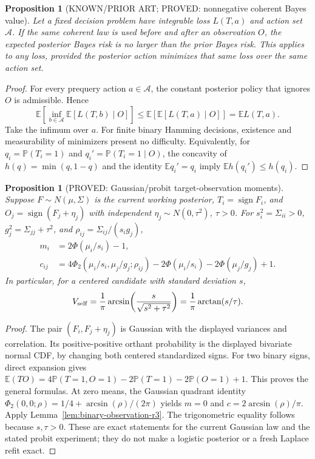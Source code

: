 \documentclass[11pt]{article}
\newtheorem{proposition}[theorem]{Proposition}
\theoremstyle{definition}
\theoremstyle{remark}
\begin{document}
\begin{proposition}[KNOWN/PRIOR ART; PROVED: nonnegative coherent Bayes value]
\label{prop:nonnegative-r3}
Let a fixed decision problem have integrable loss $L(T,a)$ and action set
$\mathcal A$. If the same coherent law is used before and after an
observation $O$, the expected posterior Bayes risk is no larger than the
prior Bayes risk. This applies to any loss, provided the posterior action
minimizes that same loss over the same action set.
\end{proposition}
\begin{proof}
For every prequery action $a\in\mathcal A$, the constant posterior policy
that ignores $O$ is admissible. Hence
\[
 \mathbb{E}\!\left[\inf_{b\in\mathcal A}
          \mathbb{E}[L(T,b)\mid O]\right]
 \le \mathbb{E}\!\left[\mathbb{E}[L(T,a)\mid O]\right]
 =\mathbb{E}L(T,a).
\]
Take the infimum over $a$. For finite binary Hamming decisions, existence
and measurability of minimizers present no difficulty. Equivalently, for
$q_i=\mathbb{P}(T_i=1)$ and $q_i'=\mathbb{P}(T_i=1\mid O)$, the concavity
of $h(q)=\min(q,1-q)$ and the identity $\mathbb{E}q_i'=q_i$ imply
$\mathbb{E}h(q_i')\le h(q_i)$.
\end{proof}

\begin{proposition}[PROVED: Gaussian/probit target-observation moments]
\label{prop:gaussian-probit-r3}
Suppose $F\sim N(\mu,\Sigma)$ is the current working posterior,
$T_i=\operatorname{sign}F_i$, and
$O_j=\operatorname{sign}(F_j+\eta_j)$ with independent
$\eta_j\sim N(0,\tau^2)$, $\tau>0$. For $s_i^2=\Sigma_{ii}>0$,
$g_j^2=\Sigma_{jj}+\tau^2$, and
$\rho_{ij}=\Sigma_{ij}/(s_i g_j)$,
\begin{align*}
 m_i&=2\Phi(\mu_i/s_i)-1,\\
 c_{ij}
 &=4\Phi_2(\mu_i/s_i,\mu_j/g_j;\rho_{ij})
   -2\Phi(\mu_i/s_i)-2\Phi(\mu_j/g_j)+1.
\end{align*}
In particular, for a centered candidate with standard deviation $s$,
\[
 V_{\rm self}
 =\frac1\pi\arcsin\!\left(\frac{s}{\sqrt{s^2+\tau^2}}\right)
 =\frac1\pi\arctan(s/\tau).
\]
\end{proposition}
\begin{proof}
The pair $(F_i,F_j+\eta_j)$ is Gaussian with the displayed variances and
correlation. Its positive-positive orthant probability is the displayed
bivariate normal CDF, by changing both centered standardized signs.
For two binary signs, direct expansion gives
$\mathbb{E}(TO)=4\mathbb{P}(T=1,O=1)-2\mathbb{P}(T=1)
-2\mathbb{P}(O=1)+1$. This proves the general formulas.
At zero means, the Gaussian quadrant identity
$\Phi_2(0,0;\rho)=1/4+\arcsin(\rho)/(2\pi)$ yields
$m=0$ and $c=2\arcsin(\rho)/\pi$. Apply
Lemma~\ref{lem:binary-observation-r3}. The trigonometric equality follows
because $s,\tau>0$. These are exact statements for the current Gaussian
law and the stated probit experiment; they do not make a logistic
posterior or a fresh Laplace refit exact.
\end{proof}
\end{document}
